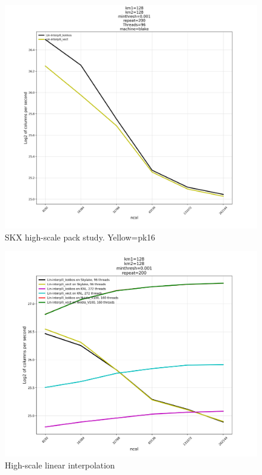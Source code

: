 \documentclass[10pt,twocolumn]{article}
\begin{document}
\begin{figure}[hbt]
  \centering
  \includegraphics[width=1.0\linewidth]{blake-pk-li.pdf}
  \caption{SKX high-scale pack study. Yellow=pk16}
\end{figure}

\begin{figure}[hbt]
  \centering
  \includegraphics[width=1.0\linewidth]{high-scale-li.pdf}
  \caption{High-scale linear interpolation}
\end{figure}
\end{document}
